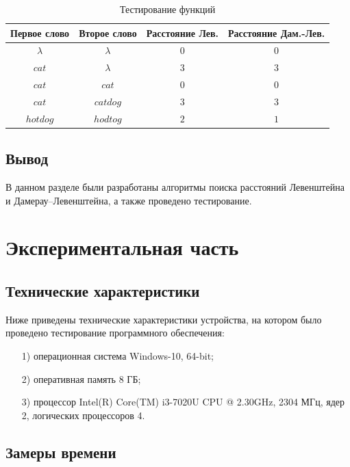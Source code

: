 \documentclass[a4paper,14pt, unknownkeysallowed]{extreport}
\begin{document}
\begin{table}[h!]
	\begin{center}
        \captionsetup{justification=raggedright,singlelinecheck=off}
		\caption{\label{tbl:test} Тестирование функций}
		\begin{tabular}{|c|c|c|c|}
			\hline
			Первое слово & Второе слово & Расстояние Лев. & Расстояние Дам.-Лев. \\ 
			\hline
			$\lambda$ & $\lambda$ & $0$ & $0$\\\hline
			$cat$  & $\lambda$ & $3$ & $3$\\\hline
			$cat$  & $cat$  & $0$ & $0$\\\hline
			$cat$  & $catdog$  & $3$ & $3$\\\hline
			$hotdog$ & $hodtog$ & $2$ & $1$\\\hline	
		\end{tabular}			
	\end{center}
\end{table}

\section*{Вывод}
В данном разделе были разработаны алгоритмы поиска расстояний Левенштейна и Дамерау–Левенштейна, а также проведено тестирование.
	
\chapter{Экспериментальная часть}
	
\section{Технические характеристики}
Ниже приведены технические характеристики устройства, на котором было проведено тестирование программного обеспечения:
	
\begin{enumerate}
	\item[1)] операционная система Windows-10, 64-bit;
	\item[2)] оперативная память 8 ГБ;
	\item[3)] процессор	Intel(R) Core(TM) i3-7020U CPU @ 2.30GHz, 2304 МГц, ядер 2, логических процессоров 4.
\end{enumerate}
	
\section{Замеры времени}
	
\end{document}
